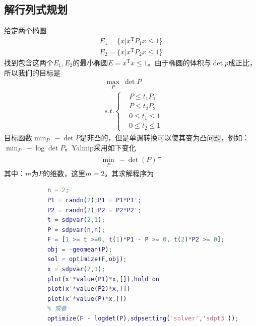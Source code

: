         \subsection{解行列式规划}
            \par
            给定两个椭圆
            \begin{align*}
            E_1 = \{x|x^\mathrm{T}P_1x \leqslant 1\}\\
            E_2 = \{x|x^\mathrm{T}P_2x \leqslant 1\}
            \end{align*}
            找到包含这两个$E_1,E_2$的最小椭圆$E = x^\mathrm{T}x \leqslant 1$。由于椭圆的体积与$\det p$成正比，所以我们的目标是
            \begin{align*}
            & \max_P \ \det P\\
            & s.t.\left\{
            \begin{aligned}
            & P \leqslant t_1P_1\\
            & P \leqslant t_2P_2\\
            & 0 \leqslant t_1 \leqslant 1\\
            & 0 \leqslant t_2 \leqslant 1
            \end{aligned}
            \right.
            \end{align*}
            目标函数$\min_P \ -\det P$是非凸的，但是单调转换可以使其变为凸问题，例如：$\min_P\ -\log \det P$。Yalmip采用如下变化
            \begin{align*}
            \min_P\ -\det (P)^{\frac{1}{m}}
            \end{align*}
            其中：$m$为$P$的维数，这里$m = 2$。其求解程序为
            \begin{lstlisting}[language = Matlab]
            %% 行列式规划
            n = 2;
            P1 = randn(2);P1 = P1*P1';
            P2 = randn(2);P2 = P2*P2';
            t = sdpvar(2,1);
            P = sdpvar(n,n);
            F = [1 >= t >=0, t(1)*P1 - P >= 0, t(2)*P2 >= 0];
            obj = -geomean(P);
            sol = optimize(F,obj);
            x = sdpvar(2,1);
            plot(x'*value(P1)*x,[]),hold on
            plot(x'*value(P2)*x,[])
            plot(x'*value(P)*x,[])
            % 或者
            optimize(F - logdet(P),sdpsetting('solver','sdpt3'));
            \end{lstlisting}
